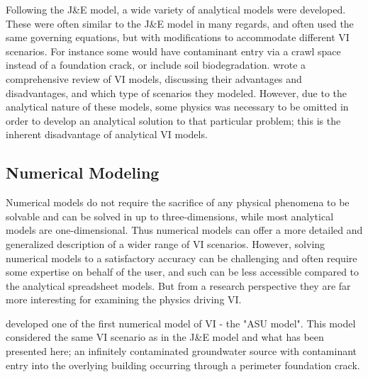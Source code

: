 Following the J\&E model, a wide variety of analytical models were developed.
These were often similar to the J\&E model in many regards, and often used the same governing equations, but with modifications to accommodate different VI scenarios.
For instance some would have contaminant entry via a crawl space instead of a foundation crack\cite{r._human_1994}, or include soil biodegradation\cite{anderssen_modelling_1997,hers_evaluation_2000}.
\citeauthor{yao_review_2013}\cite{yao_review_2013} wrote a comprehensive review of VI models, discussing their advantages and disadvantages, and which type of scenarios they modeled.
However, due to the analytical nature of these models, some physics was necessary to be omitted in order to develop an analytical solution to that particular problem; this is the inherent disadvantage of analytical VI models.\par

\subsection{Numerical Modeling}

Numerical models do not require the sacrifice of any physical phenomena to be solvable and can be solved in up to three-dimensions, while most analytical models are one-dimensional.
Thus numerical models can offer a more detailed and generalized description of a wider range of VI scenarios.
However, solving numerical models to a satisfactory accuracy can be challenging and often require some expertise on behalf of the user, and such can be less accessible compared to  the analytical spreadsheet models.
But from a research perspective they are far more interesting for examining the physics driving VI.\par

\citeauthor{abreu_effect_2005}\cite{abreu_effect_2005} developed one of the first numerical model of VI - the "ASU model".
This model considered the same VI scenario as in the J\&E model and what has been presented here; an infinitely contaminated groundwater source with contaminant entry into the overlying building occurring through a perimeter foundation crack.
